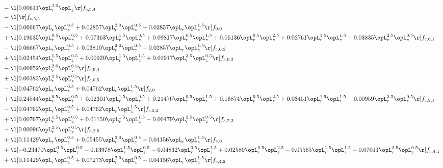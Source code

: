 \begin{alignat}{2}
& - \l[  0.00611 \opL_r^{2.0} \opL_z  \r] f_{c,5,4} \nonumber \\ 
& - \l[  \r] f_{c,5,5} \nonumber \\ 
& - \l[  0.06667 \opL_r \opL_z^{0.5} +  0.02857 \opL_r^{2.0} \opL_z^{0.5} +  0.02857 \opL_r \opL_z^{1.5}  \r] f_{0,0} \nonumber \\ 
& + \l[  0.19635 \opL_r^{0.5} \opL_z^{0.5} +  0.07363 \opL_r^{1.5} \opL_z^{0.5} +  0.09817 \opL_r^{0.5} \opL_z^{1.5} +  0.06136 \opL_r^{0.5} \opL_z^{2.5} +  0.02761 \opL_r^{1.5} \opL_z^{1.5} +  0.03835 \opL_r^{2.5} \opL_z^{0.5}  \r] f_{c,0,1} \nonumber \\ 
& - \l[  0.06667 \opL_r \opL_z^{0.5} +  0.03810 \opL_r^{2.0} \opL_z^{0.5} +  0.02857 \opL_r \opL_z^{1.5}  \r] f_{c,0,2} \nonumber \\ 
& + \l[  0.02454 \opL_r^{1.5} \opL_z^{0.5} +  0.00920 \opL_r^{1.5} \opL_z^{1.5} +  0.01917 \opL_r^{2.5} \opL_z^{0.5}  \r] f_{c,0,3} \nonumber \\ 
& - \l[  0.00952 \opL_r^{2.0} \opL_z^{0.5}  \r] f_{c,0,4} \nonumber \\ 
& + \l[  0.00383 \opL_r^{2.5} \opL_z^{0.5}  \r] f_{c,0,5} \nonumber \\ 
& - \l[  0.04762 \opL_r \opL_z^{0.5} +  0.04762 \opL_r \opL_z^{1.5}  \r] f_{2,0} \nonumber \\ 
& + \l[  0.24544 \opL_r^{0.5} \opL_z^{0.5} +  0.02301 \opL_r^{1.5} \opL_z^{0.5} +  0.21476 \opL_r^{0.5} \opL_z^{1.5} +  0.16874 \opL_r^{0.5} \opL_z^{2.5} +  0.03451 \opL_r^{1.5} \opL_z^{1.5}   -0.00959 \opL_r^{2.5} \opL_z^{0.5}  \r] f_{c,2,1} \nonumber \\ 
& - \l[  0.04762 \opL_r \opL_z^{0.5} +  0.04762 \opL_r \opL_z^{1.5}  \r] f_{c,2,2} \nonumber \\ 
& + \l[  0.00767 \opL_r^{1.5} \opL_z^{0.5} +  0.01150 \opL_r^{1.5} \opL_z^{1.5}   -0.00479 \opL_r^{2.5} \opL_z^{0.5}  \r] f_{c,2,3} \nonumber \\ 
& - \l[  0.00096 \opL_r^{2.5} \opL_z^{0.5}  \r] f_{c,2,5} \nonumber \\ 
& + \l[  0.11429 \opL_r \opL_z^{0.5} +  0.05455 \opL_r^{2.0} \opL_z^{0.5} +  0.04156 \opL_r \opL_z^{1.5}  \r] f_{4,0} \nonumber \\ 
& + \l[  -0.23470 \opL_r^{0.5} \opL_z^{0.5}   -0.13978 \opL_r^{1.5} \opL_z^{0.5}   -0.04832 \opL_r^{0.5} \opL_z^{1.5} +  0.02589 \opL_r^{0.5} \opL_z^{2.5}   -0.05565 \opL_r^{1.5} \opL_z^{1.5}   -0.07011 \opL_r^{2.5} \opL_z^{0.5}  \r] f_{c,4,1} \nonumber \\ 
& + \l[  0.11429 \opL_r \opL_z^{0.5} +  0.07273 \opL_r^{2.0} \opL_z^{0.5} +  0.04156 \opL_r \opL_z^{1.5}  \r] f_{c,4,2} \nonumber \\ 

\end{alignat}
